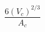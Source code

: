 \documentclass[12pt]{article}
\begin{document}
\begin{displaymath}
\frac{6 (V_c)^{2/3}}{A_c}
\end{displaymath}
\end{document}
